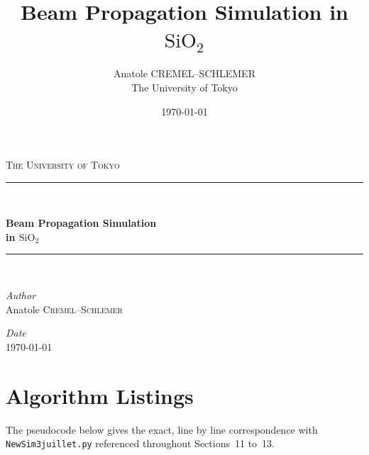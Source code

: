 \documentclass[a4paper,11pt]{article}
\title{Beam Propagation Simulation in $\mathrm{SiO}_2$}
\author{Anatole CREMEL--SCHLEMER \\ The University of Tokyo}
\date{\today}
\renewcommand{\_}{\textunderscore\allowbreak}
\begin{document}
\begin{titlepage}
    \centering
    \vspace*{2cm}
    {\Large\scshape The University of Tokyo\par}
    \vspace{3cm}

    \rule{\linewidth}{0.6mm}\\[0.5cm]
    {\huge\bfseries Beam Propagation Simulation\\[0.3cm] in $\mathrm{SiO}_2$\par}
    \vspace{0.5cm}
    \rule{\linewidth}{0.6mm}\\[2cm]

    \begin{minipage}{0.45\textwidth}
        \begin{flushleft}\large
            \textit{Author}\\
            Anatole \textsc{Cremel--Schlemer}
        \end{flushleft}
    \end{minipage}
    \hfill
    \begin{minipage}{0.45\textwidth}
        \begin{flushright}\large
            \textit{Date}\\
            \today
        \end{flushright}
    \end{minipage}

    \vfill
\end{titlepage}

\tableofcontents
\newpage


\FloatBarrier

\FloatBarrier

\FloatBarrier

\FloatBarrier

\FloatBarrier

\FloatBarrier

\FloatBarrier

\FloatBarrier

\FloatBarrier

\FloatBarrier


\FloatBarrier

\FloatBarrier

\FloatBarrier

\FloatBarrier



\appendix
\section{Algorithm Listings}
\label{sec:algorithm_listings}
The pseudocode below gives the exact, line by line correspondence with \texttt{NewSim3juillet.py} referenced throughout Sections~11 to~13.


\end{document}
